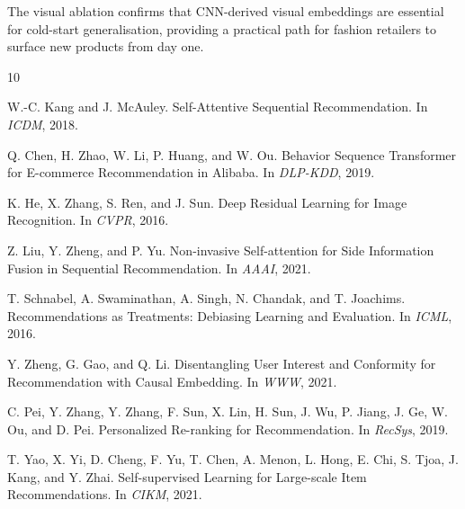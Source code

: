 \documentclass[11pt, a4paper]{article}
\begin{document}
The visual ablation confirms that CNN-derived visual embeddings are essential for cold-start generalisation, providing a practical path for fashion retailers to surface new products from day one.


\begin{thebibliography}{10}

W.-C. Kang and J. McAuley.
\newblock Self-Attentive Sequential Recommendation.
\newblock In \emph{ICDM}, 2018.

Q. Chen, H. Zhao, W. Li, P. Huang, and W. Ou.
\newblock Behavior Sequence Transformer for E-commerce Recommendation in Alibaba.
\newblock In \emph{DLP-KDD}, 2019.

K. He, X. Zhang, S. Ren, and J. Sun.
\newblock Deep Residual Learning for Image Recognition.
\newblock In \emph{CVPR}, 2016.

Z. Liu, Y. Zheng, and P. Yu.
\newblock Non-invasive Self-attention for Side Information Fusion in Sequential Recommendation.
\newblock In \emph{AAAI}, 2021.

T. Schnabel, A. Swaminathan, A. Singh, N. Chandak, and T. Joachims.
\newblock Recommendations as Treatments: Debiasing Learning and Evaluation.
\newblock In \emph{ICML}, 2016.

Y. Zheng, G. Gao, and Q. Li.
\newblock Disentangling User Interest and Conformity for Recommendation with Causal Embedding.
\newblock In \emph{WWW}, 2021.

C. Pei, Y. Zhang, Y. Zhang, F. Sun, X. Lin, H. Sun, J. Wu, P. Jiang, J. Ge, W. Ou, and D. Pei.
\newblock Personalized Re-ranking for Recommendation.
\newblock In \emph{RecSys}, 2019.

T. Yao, X. Yi, D. Cheng, F. Yu, T. Chen, A. Menon, L. Hong, E. Chi, S. Tjoa, J. Kang, and Y. Zhai.
\newblock Self-supervised Learning for Large-scale Item Recommendations.
\newblock In \emph{CIKM}, 2021.

\end{thebibliography}
\end{document}
